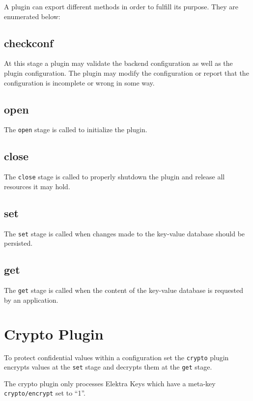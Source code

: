 A plugin can export different methods in order to fulfill its purpose.
They are enumerated below:

\subsection{checkconf}\label{checkconf}

At this stage a plugin may validate the backend configuration as well as
the plugin configuration. The plugin may modify the configuration or
report that the configuration is incomplete or wrong in some way.

\subsection{open}\label{open}

The \texttt{open} stage is called to initialize the plugin.

\subsection{close}\label{close}

The \texttt{close} stage is called to properly shutdown the plugin and
release all resources it may hold.

\subsection{set}\label{set}

The \texttt{set} stage is called when changes made to the key-value
database should be persisted.

\subsection{get}\label{get}

The \texttt{get} stage is called when the content of the key-value
database is requested by an application.

\section{Crypto Plugin}\label{crypto-plugin}

To protect confidential values within a configuration set the
\texttt{crypto} plugin encrypts values at the \texttt{set} stage and
decrypts them at the \texttt{get} stage.

The crypto plugin only processes Elektra Keys which have a meta-key
\texttt{crypto/encrypt} set to ``1''.

